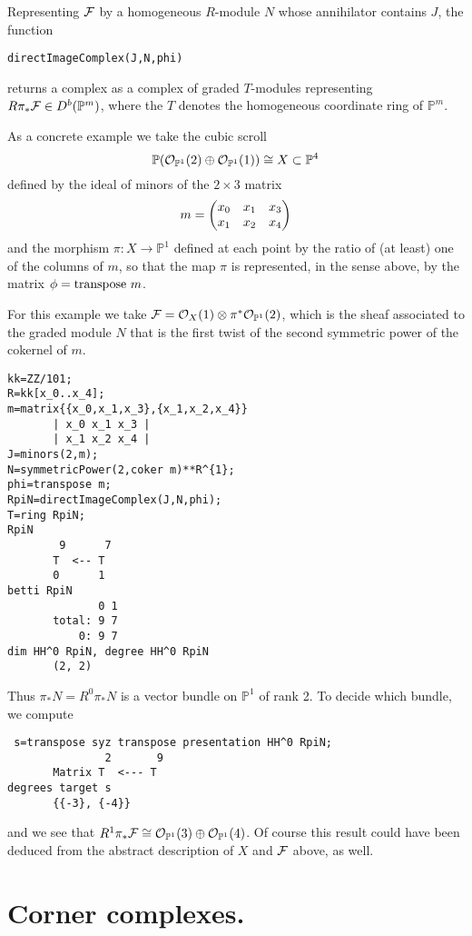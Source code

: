 \documentclass[twoside,12pt, leqno]{amsart}
\def\PP{{\mathbb P}}
\def\P{{\mathbb P}}
\begin{document}
Representing ${\mathcal F}$ by  a homogeneous $R$-module $N$
whose annihilator contains $J$, the function
{\small \begin{verbatim}
directImageComplex(J,N,phi)
\end{verbatim} }
returns a complex as a complex of graded $T$-modules representing $R\pi_* \sF \in D^b(\PP^m)$, where the $T$ denotes  the homogeneous coordinate ring of $\PP^m$.

As a concrete example we take the cubic scroll 
$$\PP(\sO_{\PP^1}(2) \oplus \sO_{\PP^1}(1))\cong X\subset \PP^4
$$ 
defined by the ideal of minors of the $2\times 3$ matrix
$$
m=\begin{pmatrix}
x_0& x_1 & x_3 \cr
x_1 & x_2 & x_4 \cr
\end{pmatrix}   
$$
and the morphism $\pi :X \to \PP^1$ defined at each point by the ratio of (at least) one of 
the columns of $m$, so that the map $\pi$ is represented, in the sense above,
by the matrix $\phi = {\rm transpose}\ m$. 

For this example we take $\sF = \sO_X(1)\otimes \pi^*\sO_{\PP^1}(2)$, which is the sheaf associated to the
graded module
$N$ that is the first twist of the second symmetric power of the cokernel 
of $m$.
{\small\begin{verbatim}
kk=ZZ/101;
R=kk[x_0..x_4];
m=matrix{{x_0,x_1,x_3},{x_1,x_2,x_4}}
       | x_0 x_1 x_3 |
       | x_1 x_2 x_4 |
J=minors(2,m);
N=symmetricPower(2,coker m)**R^{1};
phi=transpose m;
RpiN=directImageComplex(J,N,phi);
T=ring RpiN;
RpiN
        9      7
       T  <-- T               
       0      1
betti RpiN
              0 1
       total: 9 7
           0: 9 7
dim HH^0 RpiN, degree HH^0 RpiN
       (2, 2)
\end{verbatim}
\noindent Thus $\pi_*N = R^0\pi_*N$ is a vector bundle on $\P^1$ of rank 2.
To decide which bundle, we compute
\begin{verbatim}
 s=transpose syz transpose presentation HH^0 RpiN;
               2       9
       Matrix T  <--- T
degrees target s
       {{-3}, {-4}} 
\end{verbatim} }
\noindent and we see that $R^1\pi_* \sF \cong \sO_{\PP^1}(3) \oplus \sO_{\PP^1}(4)$.
Of course this result could have been deduced from the abstract description of $X$ and ${\mathcal F}$
above, as well.

\section{Corner complexes.}\label{sec:cornercomplex}
\end{document}
